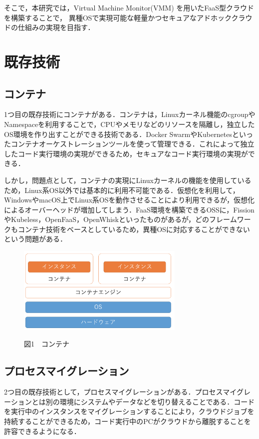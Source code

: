 \documentclass[11pt]{ujarticle} %
\begin{document}
そこで，本研究では，Virtual Machine Monitor(VMM) を用いたFaaS型クラウドを構築することで， 異種OSで実現可能な軽量かつセキュアなアドホッククラウドの仕組みの実現を目指す．

\section{既存技術}
\subsection{コンテナ}

1つ目の既存技術にコンテナがある．コンテナは，Linuxカーネル機能のcgroupやNamespaceを利用することで，CPUやメモリなどのリソースを隔離し，独立したOS環境を作り出すことができる技術である．Docker SwarmやKubernetesといったコンテナオーケストレーションツールを使って管理できる．これによって独立したコード実行環境の実現ができるため，セキュアなコード実行環境の実現ができる．

しかし，問題点として，コンテナの実現にLinuxカーネルの機能を使用しているため，Linux系OS以外では基本的に利用不可能である．仮想化を利用して，WindowsやmacOS上でLinux系OSを動作させることにより利用できるが，仮想化によるオーバーヘッドが増加してしまう．FaaS環境を構築できるOSS\cite{コンテナ}に，FissionやKubeless，OpenFaaS，OpenWhiskといったものがあるが，どのフレームワークもコンテナ技術をベースとしているため，異種OSに対応することができないという問題がある．

\begin{figure}[h]
  \includegraphics[width=8cm]{img/コンテナ.png}
\begin{center}図1　コンテナ\end{center}
\end{figure}

\subsection{プロセスマイグレーション}

2つ目の既存技術として，プロセスマイグレーションがある．プロセスマイグレーションとは別の環境にシステムやデータなどを切り替えることである．コードを実行中のインスタンスをマイグレーションすることにより，クラウドジョブを持続することができるため，コード実行中のPCがクラウドから離脱することを許容できるようになる．
\end{document}
